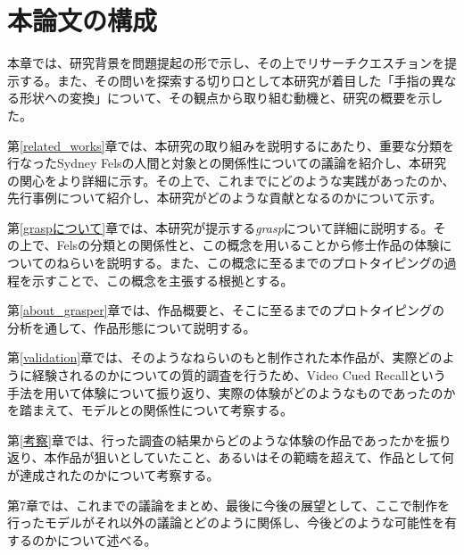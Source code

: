 \section{本論文の構成}
本章では、研究背景を問題提起の形で示し、その上でリサーチクエスチョンを提示する。また、その問いを探索する切り口として本研究が着目した「手指の異なる形状への変換」について、その観点から取り組む動機と、研究の概要を示した。

第\ref{related_works}章では、本研究の取り組みを説明するにあたり、重要な分類を行なったSydney Felsの人間と対象との関係性についての議論を紹介し、本研究の関心をより詳細に示す。その上で、これまでにどのような実践があったのか、先行事例について紹介し、本研究がどのような貢献となるのかについて示す。

第\ref{graspについて}章では、本研究が提示する\textit{grasp}について詳細に説明する。その上で、Felsの分類との関係性と、この概念を用いることから修士作品の体験についてのねらいを説明する。また、この概念に至るまでのプロトタイピングの過程を示すことで、この概念を主張する根拠とする。

第\ref{about_grasper}章では、作品概要と、そこに至るまでのプロトタイピングの分析を通して、作品形態について説明する。

第\ref{validation}章では、そのようなねらいのもと制作された本作品が、実際どのように経験されるのかについての質的調査を行うため、Video Cued Recallという手法を用いて体験について振り返り、実際の体験がどのようなものであったのかを踏まえて、モデルとの関係性について考察する。

第\ref{考察}章では、行った調査の結果からどのような体験の作品であったかを振り返り、本作品が狙いとしていたこと、あるいはその範疇を超えて、作品として何が達成されたのかについて考察する。

第7章では、これまでの議論をまとめ、最後に今後の展望として、ここで制作を行ったモデルがそれ以外の議論とどのように関係し、今後どのような可能性を有するのかについて述べる。